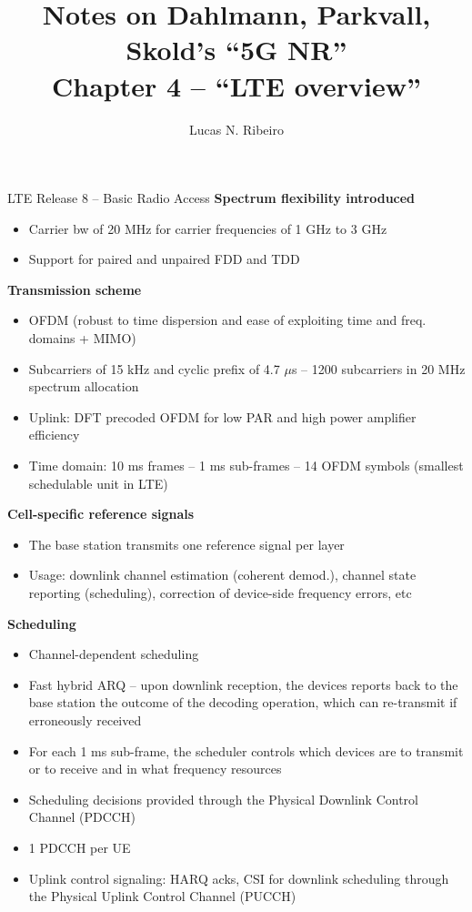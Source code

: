 \documentclass{beamer}
\title{Notes on Dahlmann, Parkvall, Skold's ``5G NR''\\Chapter 4 --  ``LTE overview''}
\author{Lucas N. Ribeiro}
\date{}
\begin{document}
	
	\frame{\titlepage}
	
	\begin{frame}[allowframebreaks]{LTE Release 8 -- Basic Radio Access}
		\textbf{Spectrum flexibility introduced}
		\begin{itemize}
			\item Carrier bw of 20 MHz for carrier frequencies of 1 GHz to 3 GHz
			\item Support for paired and unpaired FDD and TDD
		\end{itemize}
		\textbf{Transmission scheme}
		\begin{itemize}
			\item OFDM (robust to time dispersion and ease of exploiting time and freq. domains + MIMO)
			\item Subcarriers of 15 kHz and cyclic prefix of 4.7 $\mu$s -- 1200 subcarriers in 20 MHz spectrum allocation 
			\item Uplink: DFT precoded OFDM for low PAR and high power amplifier efficiency
			\item Time domain: 10 ms frames -- 1 ms sub-frames -- 14 OFDM symbols (smallest schedulable unit in LTE)
		\end{itemize}
		\newpage
		\textbf{Cell-specific reference signals}
		\begin{itemize}
			\item The base station transmits one reference signal per layer
			\item Usage: downlink channel estimation (coherent demod.), channel state reporting (scheduling), correction of device-side frequency errors, etc
		\end{itemize}
		\textbf{Scheduling}
		\begin{itemize}
			\item Channel-dependent scheduling
			\item Fast hybrid ARQ -- upon downlink reception, the devices reports back to the base station the outcome of the decoding operation, which can re-transmit if erroneously received
			\item For each 1 ms sub-frame, the scheduler controls which devices are to transmit or to receive and in what frequency resources
			\item Scheduling decisions provided through the Physical Downlink Control Channel (PDCCH)
			\item 1 PDCCH per UE
			\item Uplink control signaling: HARQ acks, CSI for downlink scheduling through the Physical Uplink Control Channel (PUCCH)

\end{itemize}
\end{frame}
\end{document}

